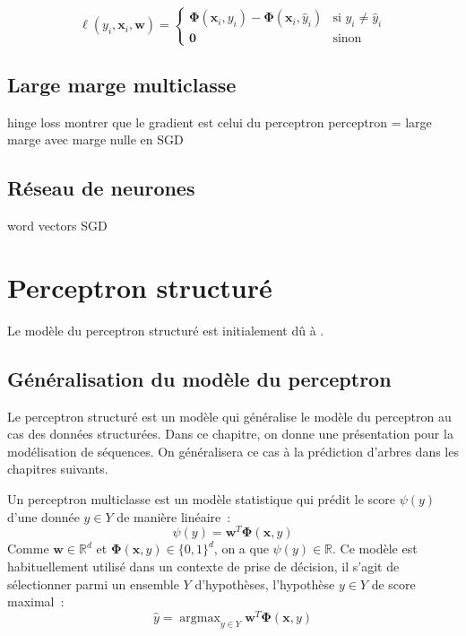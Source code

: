 \documentclass[11pt,openany]{book}
\begin{document}
\begin{displaymath}
\ell(y_i,\mathbf{x}_i,\mathbf{w}) = 
\left\{
\begin{array}{ll}
\boldsymbol\Phi(\mathbf{x}_{i},y_i)
- \boldsymbol\Phi(\mathbf{x}_i,\hat{y}_i)&\text{si } y_i \not = \hat{y}_i \\
 \mathbf{0}& \text{sinon}
\end{array}\right.
\end{displaymath}



\section{Large marge multiclasse}
hinge loss
montrer que le gradient est celui du perceptron 
perceptron = large marge avec marge nulle en SGD


\section{Réseau de neurones}
    word vectors
    SGD


\chapter{Perceptron structuré}

Le modèle du perceptron structuré est initialement dû à \cite{collins-2002}.

\section{Généralisation du modèle du perceptron}

Le perceptron structuré est un modèle qui généralise le modèle du
perceptron au cas des données structurées. 
Dans ce chapitre, on donne une présentation pour la modélisation de
séquences. On généralisera ce cas à la prédiction d'arbres dans les
chapitres suivants.

Un perceptron multiclasse est un modèle statistique qui prédit le
score $\psi(y)$ d'une donnée $y\in Y$ de manière linéaire~:
\begin{equation}
\psi(y) = \mathbf{w}^T \boldsymbol\Phi(\mathbf{x},y)
\end{equation}
Comme $\mathbf{w} \in \mathbb{R}^d$ et $\boldsymbol\Phi(\mathbf{x},y)
\in \{0,1\}^d$, on a que $\psi(y) \in \mathbb{R}$. 
Ce modèle est habituellement utilisé dans un contexte de prise de
décision, il s'agit de sélectionner parmi un ensemble $Y$ d'hypothèses, 
l'hypothèse $y\in Y$ de score maximal~:
\begin{equation}
\hat{y} =   \mathop{\text{argmax}}_{y\in Y} \mathbf{w}^T \boldsymbol\Phi(\mathbf{x},y)
\end{equation}
\end{document}
